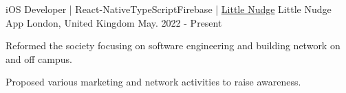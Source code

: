 \begin{cventries}
  \cventry
    {iOS Developer | React-Native\acvHeaderIconSep\bullet\acvHeaderIconSep TypeScript\acvHeaderIconSep\bullet\acvHeaderIconSep Firebase | \href{https://github.com/jerryyangboyu/LogicShark}{\faHome\acvHeaderIconSep Little Nudge}}
    {Little Nudge App} %
    {London, United Kingdom} %
    {May. 2022 - Present} %
    {
      \begin{cvitems} %
        \item {Reformed the society focusing on software engineering and building network on and off campus.}
        \item {Proposed various marketing and network activities to raise awareness.}
      \end{cvitems}
    }



\end{cventries}

